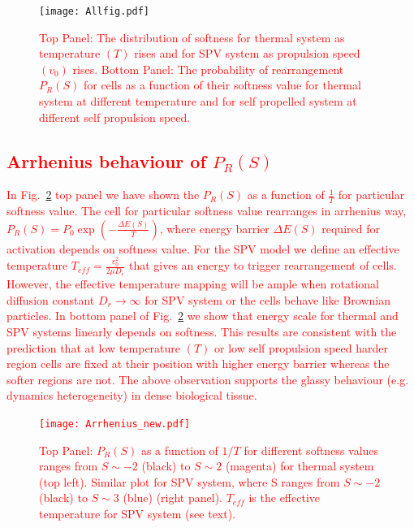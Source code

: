 \documentclass[twoside,twocolumn,9pt]{article}
\begin{document}
\begin{figure}[h]
\centering
  \texttt{[image: Allfig.pdf]}
  \caption{\textcolor{red}{Top Panel: The distribution of softness for thermal system  as temperature $(T)$ rises and for SPV system as propulsion speed $(v_0)$ rises. Bottom Panel: The probability of rearrangement $P_R(S)$ for cells as a function of their softness value for thermal system at different temperature and for self propelled system at different self propulsion speed.}}
  \label{PS_vs_T}
\end{figure}
\textcolor{red}{
\subsection{Arrhenius behaviour of $P_R(S)$}
In Fig.~\ref{Arrhenius} top panel we have shown the $P_R(S)$ as a function of $\frac{1}{T}$ for particular softness value.
The cell for particular softness value rearranges in arrhenius way, $P_R(S) = P_0 \exp(-\frac{\Delta E(S)}{T})$, where energy barrier $\Delta E(S)$ required for activation depends on softness value. For the SPV model we define an effective temperature $T_{eff}=\frac{v_0^2}{2\mu D_r}$ \cite{PhysRevLett.108.235702} that gives an energy to trigger rearrangement of cells. However, the effective temperature mapping will be ample when rotational diffusion constant $D_r \to \infty$ for SPV system or the cells behave like Brownian particles.
In bottom panel of  Fig.~\ref{Arrhenius} we show that energy scale for thermal and SPV systems linearly depends on softness. This results are consistent with the prediction that at low temperature $(T)$ or low self propulsion speed harder region cells are fixed at their position with higher energy barrier whereas the softer regions are not.
The above observation supports the glassy behaviour (e.g. dynamics heterogeneity) in dense biological tissue.
\begin{figure}[h]
\centering
\hskip -0.2in
  \texttt{[image: Arrhenius\_new.pdf]}
  \caption{\textcolor{red}{Top Panel: $P_R(S)$ as a function of  $1/T$ for different softness values ranges from $S \sim -2$ (black) to $S \sim 2$ (magenta) for thermal system (top left). Similar plot for SPV system, where S ranges from $S \sim -2$ (black) to $S \sim 3$ (blue) (right panel). $T_{eff}$ is the effective temperature for SPV system (see text).}}
  \label{Arrhenius}
\end{figure}
}
\end{document}
